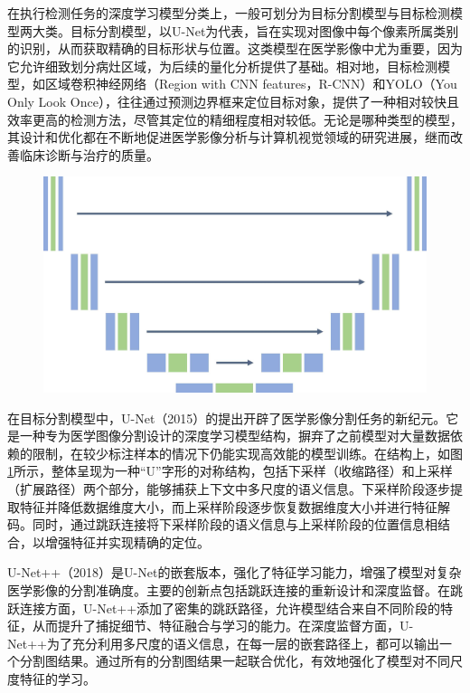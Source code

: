 在执行检测任务的深度学习模型分类上，一般可划分为目标分割模型与目标检测模型两大类。目标分割模型，以U-Net\cite{ronneberger2015u}为代表，旨在实现对图像中每个像素所属类别的识别，从而获取精确的目标形状与位置。这类模型在医学影像中尤为重要，因为它允许细致划分病灶区域，为后续的量化分析提供了基础。相对地，目标检测模型，如区域卷积神经网络（Region with CNN features，R-CNN）\cite{girshick2014rich}和YOLO（You Only Look Once）\cite{redmon2016you}，往往通过预测边界框来定位目标对象，提供了一种相对较快且效率更高的检测方法，尽管其定位的精细程度相对较低。无论是哪种类型的模型，其设计和优化都在不断地促进医学影像分析与计算机视觉领域的研究进展，继而改善临床诊断与治疗的质量。

\begin{figure}[htbp]
  \centering
  \includegraphics[width=\textwidth]{figures/chap02_unet.jpg}
  \label{fig:chap02_unet}
\end{figure}

在目标分割模型中，U-Net\cite{ronneberger2015u}（2015）的提出开辟了医学影像分割任务的新纪元。它是一种专为医学图像分割设计的深度学习模型结构，摒弃了之前模型对大量数据依赖的限制，在较少标注样本的情况下仍能实现高效能的模型训练。在结构上，如图\ref{fig:chap02_unet}所示，整体呈现为一种“U”字形的对称结构，包括下采样（收缩路径）和上采样（扩展路径）两个部分，能够捕获上下文中多尺度的语义信息。下采样阶段逐步提取特征并降低数据维度大小，而上采样阶段逐步恢复数据维度大小并进行特征解码。同时，通过跳跃连接将下采样阶段的语义信息与上采样阶段的位置信息相结合，以增强特征并实现精确的定位。

U-Net++\cite{zhou2018unet++}（2018）是U-Net\cite{ronneberger2015u}的嵌套版本，强化了特征学习能力，增强了模型对复杂医学影像的分割准确度。主要的创新点包括跳跃连接的重新设计和深度监督。在跳跃连接方面，U-Net++添加了密集的跳跃路径，允许模型结合来自不同阶段的特征，从而提升了捕捉细节、特征融合与学习的能力。在深度监督方面，U-Net++为了充分利用多尺度的语义信息，在每一层的嵌套路径上，都可以输出一个分割图结果。通过所有的分割图结果一起联合优化，有效地强化了模型对不同尺度特征的学习。

